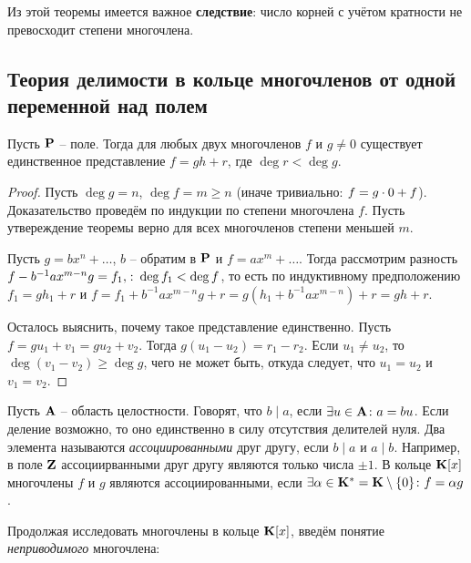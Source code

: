Из этой теоремы имеется важное {\bfseries следствие}: число корней с учётом кратности не превосходит степени многочлена.

\subsection[Теория делимости многочленов]{Теория делимости в кольце многочленов от одной переменной над полем}

\begin{theorem}
  Пусть $\mathbf{P}$ -- поле. Тогда для любых двух многочленов $f$ и $g\ne0$
  существует единственное представление $f=gh+r$, где $\deg r<\deg
  g$.
\end{theorem}
\begin{proof}
  Пусть $\deg g=n$, $\deg f=m\ge n$ (иначе тривиально: $f\bw=g\cdot0+f$). Доказательство проведём по индукции по степени многочлена $f$. Пусть утвереждение теоремы верно для всех многочленов степени меньшей $m$. 
  
  Пусть $g = bx^n+\dots$, $b$ -- обратим в $\mathbf{P}$ и $f=ax^m+\dots$. Тогда рассмотрим разность $f-b^{-1}ax^{m-n}g = f_1,\colon\deg f_1<\deg f$, то есть по индуктивному предположению $f_1=gh_1+r$ и $f=f_1+b^{-1}ax^{m-n}g+r=g(h_1+b^{-1}ax^{m-n})+r=gh+r$.
  
  Осталось выяснить, почему такое представление единственно. Пусть $f=gu_1+v_1=gu_2+v_2$. Тогда $g(u_1-u_2)=r_1-r_2$. Если $u_1\ne u_2$, то $\deg (v_1-v_2)\ge\deg g$, чего не может быть, откуда следует, что $u_1=u_2$ и $v_1=v_2$.
\end{proof}

Пусть $\mathbf{A}$ -- область целостности. Говорят, что $b\mid a$, если $\exists u\in\mathbf{A}\colon a=bu$. Если деление возможно, то оно единственно в силу отсутствия делителей нуля. Два элемента называются \emph{ассоциированными} друг другу, если $b\mid a$ и $a\mid b$. Например, в поле $\mathbf{Z}$ ассоциирванными друг другу являются только числа $\pm1$. В кольце $\mathbf{K}[x]$ многочлены $f$ и $g$ являются ассоциированными, если $\exists\alpha\in\mathbf{K}^*=\mathbf{K}\setminus\{0\}\colon f=\alpha g$.

Продолжая исследовать многочлены в кольце $\mathbf{K}[x]$, введём понятие \emph{неприводимого} многочлена:

